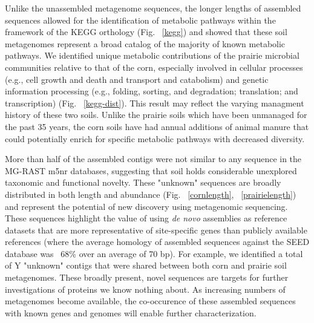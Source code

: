 \documentclass{pnastwo}
\begin{document}
\begin{article}
Unlike the unassembled metagenome sequences, the longer lengths of assembled
sequences allowed for the identification of metabolic pathways within the framework of 
the KEGG orthology (Fig. ~\ref{kegg}) and showed that these
soil metagenomes represent a broad catalog of the majority of known metabolic pathways. We
identified unique metabolic contributions of the prairie microbial communities
relative to that of the corn, especially involved in cellular processes (e.g.,
cell growth and death and transport and catabolism) and genetic information
processing (e.g., folding, sorting, and degradation; translation; and
transcription) (Fig. ~\ref{kegg-dist}). This result may reflect the varying managment
history of these two soils. Unlike the prairie soils which have been unmanaged
for the past 35 years, the corn soils have had annual additions of animal manure
that could potentially enrich for specific metabolic pathways with decreased
diversity.

More than half of the assembled contigs were not similar to any sequence
in the MG-RAST m5nr databases, suggesting that soil holds considerable unexplored taxonomic
and functional novelty. These "unknown" sequences are
broadly distributed in both length and abundance (Fig. ~\ref{cornlength}, ~\ref{prairielength}) and
represent the potential of new discovery using metagenomic sequencing. 
These sequences highlight the value of using {\em de novo}
assemblies as reference datasets that are more representative of site-specific
genes than publicly available references (where the average homology of assembled
sequences against the SEED database was ~68\% over an average of 70 bp).  For example, we
identified a total of Y "unknown" contigs that were shared between both corn and prairie soil
metagenomes.  These broadly present, novel sequences are targets for further
investigations of proteins we know nothing about. As increasing numbers of metagenomes become available, the co-occurence of these assembled sequences with known genes and genomes will enable further characterization.


\end{article}
\end{document}

